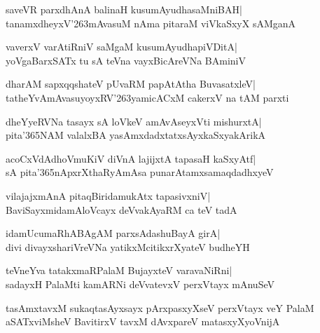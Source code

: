 \documentclass[twoside,12pt,openright]{book}
\newcounter{shloka}[chapter]
\begin{document}
\begin{shloka}%
saveVR parxdhAnA balinaH kusumAyudhasaMniBAH|\\
tanamxdheyxV\char'263mAvasuM nAma pitaraM viVkaSxyX sAMganA
\end{shloka}

\begin{shloka}%
vaverxV varAtiRniV saMgaM kusumAyudhapiVDitA|\\
yoVgaBarxSATx tu sA teVna vayxBicAreVNa BAminiV
\end{shloka}

\begin{shloka}%
dharAM sapxqqshateV pUvaRM papAtAtha BuvasatxleV|\\
tatheYvAmAvasuyoyxRV\char'263yamicACxM cakerxV na tAM parxti
\end{shloka}

\begin{shloka}%
dheYyeRVNa tasayx sA loVkeV amAvAseyxVti mishurxtA|\\
pita\char'365NAM valalxBA yasAmxdadxtatxsAyxkaSxyakArikA
\end{shloka}

\begin{shloka}%
acoCxVdAdhoVmuKiV diVnA lajijxtA tapasaH kaSxyAtf|\\
sA pita\char'365nApxrXthaRyAmAsa punarAtamxsamaqdadhxyeV
\end{shloka}

\begin{shloka}%
vilajajxmAnA pitaqBiridamukAtx tapasivxniV|\\
BaviSayxmidamAloVcayx deVvakAyaRM ca teV tadA
\end{shloka}

\begin{shloka}%
idamUcumaRhABAgAM parxsAdashuBayA girA|\\
divi divayxshariVreVNa yatikxMcitikxrXyateV budheYH
\end{shloka}

\begin{shloka}%
teVneYva tatakxmaRPalaM BujayxteV varavaNiRni|\\
sadayxH PalaMti kamARNi deVvatevxV perxVtayx mAnuSeV
\end{shloka}

\begin{shloka}%
tasAmxtavxM sukaqtasAyxsayx pArxpasxyXseV perxVtayx veY PalaM \\
aSATxviMsheV BavitirxV tavxM dAvxpareV matasxyXyoVnijA
\end{shloka}
\end{document}
